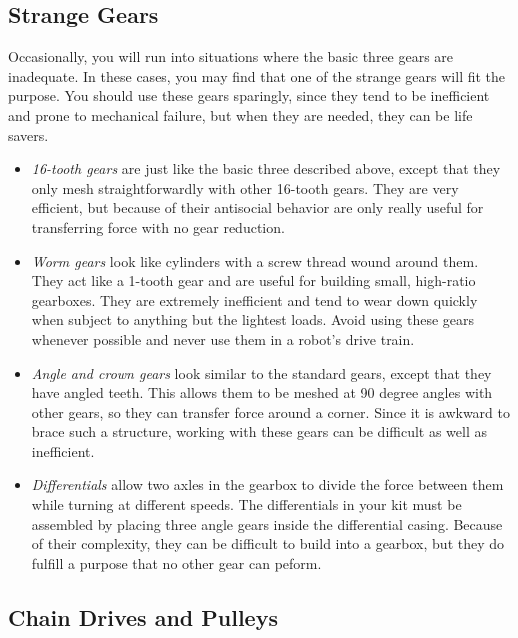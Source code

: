 \subsection{Strange Gears}

Occasionally, you will run into situations where the basic three gears
are inadequate.  In these cases, you may find that one of the strange
gears will fit the purpose.  You should use these gears sparingly,
since they tend to be inefficient and prone to mechanical failure, but
when they are needed, they can be life savers.

\begin{itemize}

 \item {\it 16-tooth gears} are just like the basic three described
 above, except that they only mesh straightforwardly with other
 16-tooth gears.  They are very efficient, but because of their
 antisocial behavior are only really useful for transferring force
 with no gear reduction.

 \item {\it Worm gears} look like cylinders with a screw thread wound
 around them.  They act like a 1-tooth gear and are useful for
 building small, high-ratio gearboxes. They are extremely inefficient
 and tend to wear down quickly when subject to anything but the
 lightest loads.  Avoid using these gears whenever possible and never
 use them in a robot's drive train.

 \item {\it Angle and crown gears} look similar to the standard gears,
 except that they have angled teeth.  This allows them to be meshed at
 90 degree angles with other gears, so they can transfer force around
 a corner. Since it is awkward to brace such a structure, working with
 these gears can be difficult as well as inefficient.

 \item {\it Differentials} allow two axles in the gearbox to divide
 the force between them while turning at different speeds.  The
 differentials in your kit must be assembled by placing three angle
 gears inside the differential casing.  Because of their complexity,
 they can be difficult to build into a gearbox, but they do fulfill a
 purpose that no other gear can peform.

\end{itemize}

\subsection{Chain Drives and Pulleys}

